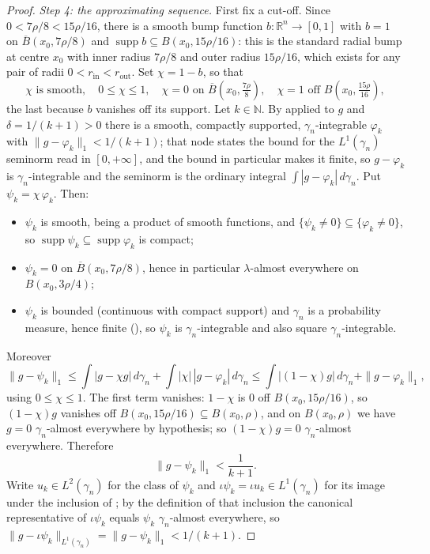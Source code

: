 \begin{proof}
\emph{Step 4: the approximating sequence.}
First fix a cut-off.  Since $0 < 7\rho/8 < 15\rho/16$, there is a smooth bump
function $b : \mathbb{R}^n \to [0,1]$ with
$b = 1$ on $\overline B(x_0,7\rho/8)$ and
$\operatorname{supp} b \subseteq B(x_0,15\rho/16)$: this is the standard radial
bump at centre $x_0$ with inner radius $7\rho/8$ and outer radius $15\rho/16$,
which exists for any pair of radii $0 < r_{\mathrm{in}} < r_{\mathrm{out}}$.
Set $\chi = 1 - b$, so that
\[
  \chi \text{ is smooth},\quad 0 \leq \chi \leq 1,\quad
  \chi = 0 \text{ on } \overline B(x_0,\tfrac{7\rho}{8}),\quad
  \chi = 1 \text{ off } B(x_0,\tfrac{15\rho}{16}) ,
\]
the last because $b$ vanishes off its support.
Let $k \in \mathbb{N}$.  By  applied to $g$
and $\delta = 1/(k+1) > 0$ there is a smooth, compactly supported,
$\gamma_n$-integrable $\varphi_k$ with $\|g-\varphi_k\|_1 < 1/(k+1)$; that node
states the bound for the $L^1(\gamma_n)$ seminorm read in $[0,+\infty]$, and the
bound in particular makes it finite, so $g - \varphi_k$ is $\gamma_n$-integrable
and the seminorm is the ordinary integral $\int|g-\varphi_k|\,d\gamma_n$.  Put
$\psi_k = \chi\,\varphi_k$.  Then:
\begin{itemize}
\item $\psi_k$ is smooth, being a product of smooth functions, and
$\{\psi_k \neq 0\} \subseteq \{\varphi_k \neq 0\}$, so
$\operatorname{supp}\psi_k \subseteq \operatorname{supp}\varphi_k$ is compact;
\item $\psi_k = 0$ on $\overline B(x_0,7\rho/8)$, hence in particular
$\lambda$-almost everywhere on $B(x_0,3\rho/4)$;
\item $\psi_k$ is bounded (continuous with compact support) and $\gamma_n$ is a
probability measure, hence finite (), so $\psi_k$ is
$\gamma_n$-integrable and also square $\gamma_n$-integrable.
\end{itemize}
Moreover
\[
  \|g - \psi_k\|_1
    \leq \int|g - \chi g|\,d\gamma_n + \int|\chi|\,|g - \varphi_k|\,d\gamma_n
    \leq \int\bigl|(1-\chi)g\bigr|\,d\gamma_n + \|g-\varphi_k\|_1 ,
\]
using $0 \leq \chi \leq 1$.  The first term vanishes: $1-\chi$ is $0$ off
$B(x_0,15\rho/16)$, so $(1-\chi)g$ vanishes off $B(x_0,15\rho/16) \subseteq
B(x_0,\rho)$, and on $B(x_0,\rho)$ we have $g = 0$ $\gamma_n$-almost everywhere
by hypothesis; so $(1-\chi)g = 0$ $\gamma_n$-almost everywhere.  Therefore
\begin{equation*}
  \|g-\psi_k\|_1 < \frac{1}{k+1} . \tag{3}
\end{equation*}
Write $u_k \in L^2(\gamma_n)$ for the class of $\psi_k$ and
$\iota\psi_k = \iota u_k \in L^1(\gamma_n)$ for its image under the inclusion of
; by the definition of that inclusion the canonical
representative of $\iota\psi_k$ equals $\psi_k$ $\gamma_n$-almost everywhere,
so $\|g - \iota\psi_k\|_{L^1(\gamma_n)} = \|g-\psi_k\|_1 < 1/(k+1)$.


\end{proof}
